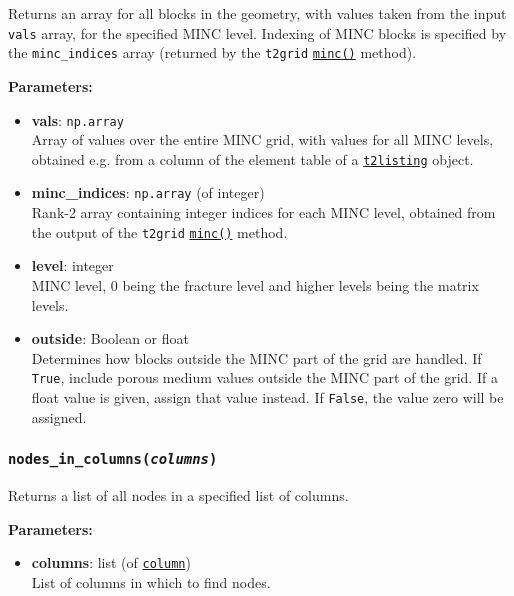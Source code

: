 Returns an array for all blocks in the geometry, with values taken from the input \texttt{vals} array, for the specified MINC level. Indexing of MINC blocks is specified by the \texttt{minc\_indices} array (returned by the \texttt{t2grid} \hyperref[sec:t2grid:MINC]{\texttt{minc()}} method).

\textbf{Parameters:}
\begin{itemize}
\item \textbf{vals}: \texttt{np.array}\\
  Array of values over the entire MINC grid, with values for all MINC levels, obtained e.g. from a column of the element table of a \hyperref[listingfiles]{\texttt{t2listing}} object.
\item \textbf{minc\_indices}: \texttt{np.array} (of integer)\\
  Rank-2 array containing integer indices for each MINC level, obtained from the output of the \texttt{t2grid} \hyperref[sec:t2grid:MINC]{\texttt{minc()}} method.
\item \textbf{level}: integer\\
  MINC level, 0 being the fracture level and higher levels being the matrix levels.
\item \textbf{outside}: Boolean or float\\
  Determines how blocks outside the MINC part of the grid are handled. If \texttt{True}, include porous medium values outside the MINC part of the grid. If a float value is given, assign that value instead. If \texttt{False}, the value zero will be assigned.
\end{itemize}

\begin{snugshade}\subsubsection{\texttt{nodes\_in\_columns(\emph{columns})}}\end{snugshade}
\label{sec:mulgrid:nodes_in_columns}

Returns a list of all nodes in a specified list of columns.

\textbf{Parameters:}
\begin{itemize}
\item \textbf{columns}: list (of \hyperref[columnobjects]{\texttt{column}})\\
  List of columns in which to find nodes.
\end{itemize}

